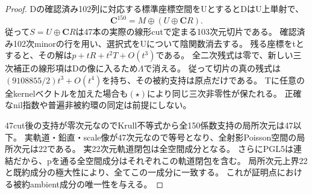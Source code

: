 \documentclass[a4paper,11pt]{ltjsarticle}
\theoremstyle{definition}
\newcommand{\CC}{\mathbf C}
\begin{document}
\begin{proof}
Dの確認済み102列に対応する標準座標空間をUとするとDはU上単射で、
\[
 \CC^{150}=M\oplus(U\oplus\CC R).
\]
従って$S=U\oplus\CC R$は47本の実際の線形cutで定まる103次元切片である。
確認済み102次minorの行を用い、選択式をUについて陰関数消去する。
残る座標をtとすると、その解は$p+tR+t^2T+O(t^3)$である。
全二次残式は零で、新しい三次補正の線形項はDの像に入るため$\Lambda$で消える。
従って切片の真の残式は
$(9108855/2)t^3+O(t^4)$を持ち、その被約支持は原点だけである。
Tに任意の全kernelベクトルを加えた場合も$(\star)$により同じ三次非零性が保たれる。
正確なnil指数や普遍非被約環の同定は前提にしない。

47cut後の支持が零次元なのでKrull不等式から全150係数支持の局所次元は47以下。
実軌道・鉛直・scale像が47次元なので等号となり、全射影Poisson空間の局所次元は22である。
実22次元軌道閉包は全空間成分となる。
さらにPGL5は連結だから、pを通る全空間成分はそれぞれこの軌道閉包を含む。
局所次元上界22と既約成分の極大性により、全てこの一成分に一致する。
これが証明点における被約ambient成分の唯一性を与える。
\end{proof}
\end{document}
